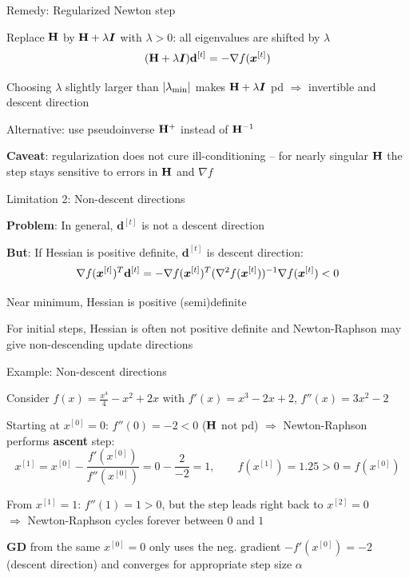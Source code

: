 \documentclass[11pt,compress,t,notes=noshow, xcolor=table]{beamer}
\begin{document}
\begin{framei}[sep=L]{Remedy: Regularized Newton step}
\item Replace $\mathbf{H}$ by $\mathbf{H} + \lambda \bm{I}$ with $\lambda > 0$: all eigenvalues are shifted by $\lambda$
$$
(\mathbf{H} + \lambda \bm{I}) \mathbf{d}^{[t]} = - \nabla f(\bm{x}^{[t]})
$$
\item Choosing $\lambda$ slightly larger than $|\lambda_\text{min}|$ makes $\mathbf{H} + \lambda \bm{I}$ pd
$\Rightarrow$ invertible and descent direction
\item Alternative: use pseudoinverse $\mathbf{H}^+$ instead of $\mathbf{H}^{-1}$
\item \textbf{Caveat}: regularization does not cure ill-conditioning -- for nearly singular $\mathbf{H}$ the step
stays sensitive to errors in $\mathbf{H}$ and $\nabla f$
\end{framei}


\begin{framei}[sep=L]{Limitation 2: Non-descent directions}
\item \textbf{Problem}: In general, $\mathbf{d}^{[t]}$ is not a descent direction
\item \textbf{But}: If Hessian is positive definite, $\mathbf{d}^{[t]}$ is descent direction:
$$
\nabla f(\bm{x}^{[t]})^T \mathbf{d}^{[t]} = - \nabla f(\bm{x}^{[t]})^T (\nabla^2 f(\bm{x}^{[t]}))^{-1} \nabla f(\bm{x}^{[t]}) < 0
$$
\item Near minimum, Hessian is positive (semi)definite
\item For initial steps, Hessian is often not positive definite and Newton-Raphson may give non-descending update directions
\end{framei}


\begin{framei}[fs=small]{Example: Non-descent directions}
\item Consider $f(x) = \frac{x^4}{4} - x^2 + 2x$ with $f'(x) = x^3 - 2x + 2$, $f''(x) = 3x^2 - 2$
\item Starting at $x^{[0]} = 0$: $f''(0) = -2 < 0$ ($\mathbf{H}$ not pd) $\Rightarrow$ Newton-Raphson performs \textbf{ascent} step:
$$
x^{[1]} = x^{[0]} - \frac{f'(x^{[0]})}{f''(x^{[0]})} = 0 - \frac{2}{-2} = 1, \qquad f(x^{[1]}) = 1.25 > 0 = f(x^{[0]})
$$
\item From $x^{[1]} = 1$: $f''(1) = 1 > 0$, but the step leads right back to $x^{[2]} = 0$ \\
$\Rightarrow$ Newton-Raphson cycles forever between $0$ and $1$
\item \textbf{GD} from the same $x^{[0]} = 0$ only uses the neg. gradient $-f'(x^{[0]})=-2$ (descent direction) and converges for appropriate step size $\alpha$
\end{framei}
\end{document}
